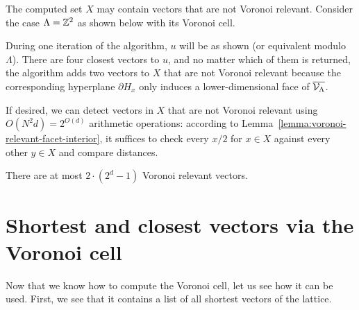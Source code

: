\begin{example}
  The computed set $X$ may contain vectors that are not Voronoi relevant.
  Consider the case $\Lambda = \mathbb{Z}^2$ as shown below with its Voronoi cell.
  \begin{center}
  \end{center}
  During one iteration of the algorithm, $u$ will be as shown (or equivalent modulo $\Lambda$).
  There are four closest vectors to $u$, and no matter which of them is returned,
  the algorithm adds two vectors to $X$ that are not Voronoi relevant because
  the corresponding hyperplane $\partial H_x$ only induces
  a lower-dimensional face of $\overline{\mathcal{V}_\Lambda}$.
\end{example}

If desired, we can detect vectors in $X$ that are not Voronoi relevant
using $O(N^2 d) = 2^{O(d)}$ arithmetic operations:
according to Lemma~\ref{lemma:voronoi-relevant-facet-interior},
it suffices to check every $x/2$ for $x \in X$ against every other $y \in X$
and compare distances.


\begin{corollary}
  \label{cor:number-of-voronoi-relevant}
  There are at most $2 \cdot (2^d - 1)$ Voronoi relevant vectors.
\end{corollary}



\section{Shortest and closest vectors via the Voronoi cell}
\label{sec:svp-cvp-via-voronoi}

Now that we know how to compute the Voronoi cell,
let us see how it can be used.
First, we see that it contains a list of all shortest vectors of the lattice.

